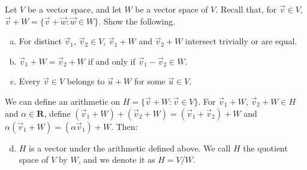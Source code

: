 \documentclass[a4paper,11pt]{article}
\newcommand{\R}{\mathbf{R}}
\begin{document}
 Let $V$ be a vector space, and let $W$ be a
vector space of $V$. Recall that, for $\vec v \in V$, $\vec v + W = \{\vec
v+\vec w : \vec w \in W\}$. Show the following.
\begin{enumerate}[(a)]
\item For distinct $\vec v_1,\,\vec v_2 \in V$, $\vec v_1+W$ and $\vec v_2+W$
  intersect trivially or are equal.
\item $\vec v_1+W = \vec v_2+W$ if and only if $\vec v_1 - \vec v_2 \in W$.
\item Every $\vec v \in V$ belongs to $\vec u+W$ for some $\vec u \in V$.
\end{enumerate}
We can define an arithmetic on $H = \{\vec v+W : \vec v \in V\}$. For $\vec
v_1+W,\,\vec v_2+W \in H$ and $\alpha \in \R$, define $(\vec v_1+W)+(\vec v_2+W)
= (\vec v_1+\vec v_2)+W$ and $\alpha(\vec v_1 + W) = (\alpha\vec v_1)+W$. Then:
\begin{enumerate}[(a)]
  \setcounter{enumi}{3}
\item $H$ is a vector under the arithmetic defined above. We call $H$ the
  quotient space of $V$ by $W$, and we denote it as $H = V/W$.
\end{enumerate}
\end{document}
